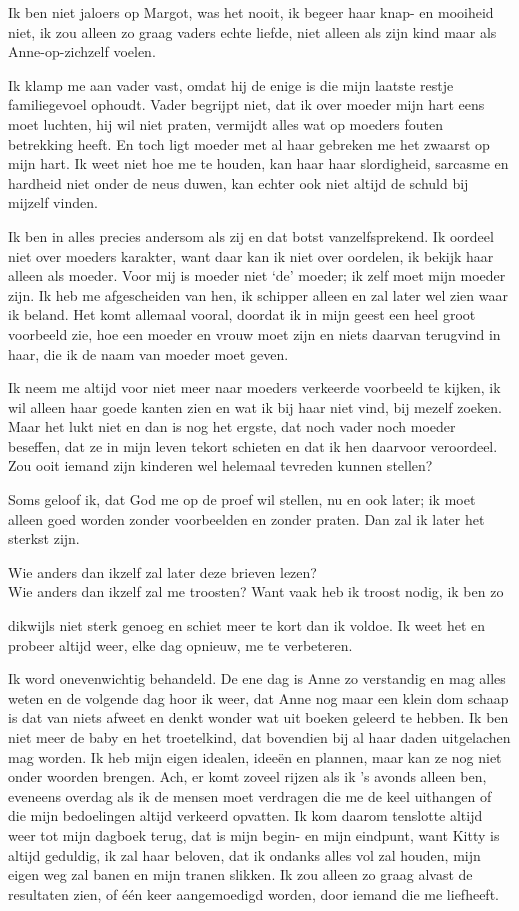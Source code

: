 \documentclass{book}
\begin{document}
Ik ben niet jaloers op Margot, was het nooit, ik begeer haar knap- en mooiheid
niet, ik zou alleen zo graag vaders echte liefde, niet alleen als zijn kind maar
als Anne-op-zichzelf voelen.

Ik klamp me aan vader vast, omdat hij de enige is die mijn laatste restje
familiegevoel ophoudt. Vader begrijpt niet, dat ik over moeder mijn hart eens
moet luchten, hij wil niet praten, vermijdt alles wat op moeders fouten
betrekking heeft. En toch ligt moeder met al haar gebreken me het zwaarst op
mijn hart. Ik weet niet hoe me te houden, kan haar haar slordigheid, sarcasme en
hardheid niet onder de neus duwen, kan echter ook niet altijd de schuld bij
mijzelf vinden.

Ik ben in alles precies andersom als zij en dat botst vanzelfsprekend.  Ik
oordeel niet over moeders karakter, want daar kan ik niet over oordelen, ik
bekijk haar alleen als moeder. Voor mij is moeder niet `de' moeder; ik zelf moet
mijn moeder zijn. Ik heb me afgescheiden van hen, ik schipper alleen en zal
later wel zien waar ik beland. Het komt allemaal vooral, doordat ik in mijn
geest een heel groot voorbeeld zie, hoe een moeder en vrouw moet zijn en niets
daarvan terugvind in haar, die ik de naam van moeder moet geven.

Ik neem me altijd voor niet meer naar moeders verkeerde voorbeeld te kijken, ik
wil alleen haar goede kanten zien en wat ik bij haar niet vind, bij mezelf
zoeken. Maar het lukt niet en dan is nog het ergste, dat noch vader noch moeder
beseffen, dat ze in mijn leven tekort schieten en dat ik hen daarvoor
veroordeel. Zou ooit iemand zijn kinderen wel helemaal tevreden kunnen stellen?

Soms geloof ik, dat God me op de proef wil stellen, nu en ook later; ik moet
alleen goed worden zonder voorbeelden en zonder praten. Dan zal ik later het
sterkst zijn.

Wie anders dan ikzelf zal later deze brieven lezen?\\
Wie anders dan ikzelf zal
me troosten? Want vaak heb ik troost nodig, ik ben zo

dikwijls niet sterk genoeg en schiet meer te kort dan ik voldoe. Ik weet het en
probeer altijd weer, elke dag opnieuw, me te verbeteren.

Ik word onevenwichtig behandeld. De ene dag is Anne zo verstandig en mag alles
weten en de volgende dag hoor ik weer, dat Anne nog maar een klein dom schaap is
dat van niets afweet en denkt wonder wat uit boeken geleerd te hebben. Ik ben
niet meer de baby en het troetelkind, dat bovendien bij al haar daden
uitgelachen mag worden. Ik heb mijn eigen idealen, ideeën en plannen, maar kan
ze nog niet onder woorden brengen.  Ach, er komt zoveel rijzen als ik 's avonds
alleen ben, eveneens overdag als ik de mensen moet verdragen die me de keel
uithangen of die mijn bedoelingen altijd verkeerd opvatten. Ik kom daarom
tenslotte altijd weer tot mijn dagboek terug, dat is mijn begin- en mijn
eindpunt, want Kitty is altijd geduldig, ik zal haar beloven, dat ik ondanks
alles vol zal houden, mijn eigen weg zal banen en mijn tranen slikken. Ik zou
alleen zo graag alvast de resultaten zien, of één keer aangemoedigd worden, door
iemand die me liefheeft.
\end{document}
